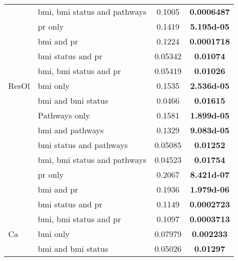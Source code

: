 \begin{ThreePartTable}
\begin{longtable}{llcc}
		                                  & \gls{bmi}, \gls{bmi} status and pathways & 0.1005     & \bfseries 0.0006487 \\
		                                  & \gls{pr} only                            & 0.1419     & \bfseries \num{5.195d-05} \\
		                                  & \gls{bmi} and \gls{pr}                   & 0.1224     & \bfseries 0.0001718 \\
		                                  & \gls{bmi} status and \gls{pr}            & 0.05342    & \bfseries 0.01074   \\
		                                  & \gls{bmi}, \gls{bmi} status and \gls{pr} & 0.05419    & \bfseries 0.01026   \\
				\hline
				\rule{0pt}{2.25ex}ResOl   & \gls{bmi} only                           & 0.1535     & \bfseries \num{2.536d-05} \\
		                                  & \gls{bmi} and \gls{bmi} status           & 0.0466     & \bfseries 0.01615   \\
		                                  & Pathways only                            & 0.1581     & \bfseries \num{1.899d-05} \\
		                                  & \gls{bmi} and pathways                   & 0.1329     & \bfseries \num{9.083d-05} \\
		                                  & \gls{bmi} status and pathways            & 0.05085    & \bfseries 0.01252   \\
		                                  & \gls{bmi}, \gls{bmi} status and pathways & 0.04523    & \bfseries 0.01754   \\
		                                  & \gls{pr} only                            & 0.2067     & \bfseries \num{8.421d-07} \\
		                                  & \gls{bmi} and \gls{pr}                   & 0.1936     & \bfseries \num{1.979d-06} \\
		                                  & \gls{bmi} status and \gls{pr}            & 0.1149     & \bfseries 0.0002723 \\
		                                  & \gls{bmi}, \gls{bmi} status and \gls{pr} & 0.1097     & \bfseries 0.0003713 \\
				\hline
				\rule{0pt}{2.25ex}Ca      & \gls{bmi} only                           & 0.07979    & \bfseries 0.002233  \\
		                                  & \gls{bmi} and \gls{bmi} status           & 0.05026    & \bfseries 0.01297   \\

\end{longtable}
\end{ThreePartTable}
